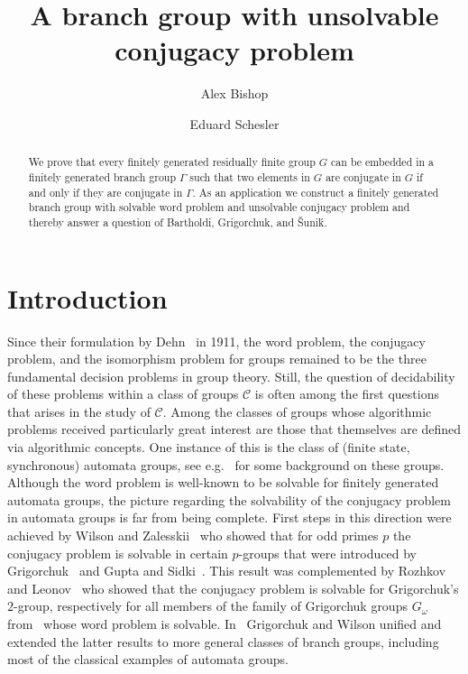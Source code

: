 \documentclass[a4paper]{amsart}
\title[A branch group with unsolvable conjugacy problem]{A branch group with unsolvable conjugacy problem}
\author[A. Bishop]{Alex Bishop}
\author[E. Schesler]{Eduard Schesler}
\numberwithin{equation}{section}
\theoremstyle{definition}
\theoremstyle{remark}
\begin{document}
\begin{abstract}
We prove that every finitely generated residually finite group $G$ can be embedded in a finitely generated branch group $\Gamma$ such that two elements in $G$ are conjugate in $G$ if and only if they are conjugate in $\Gamma$.
As an application we construct a finitely generated branch group with solvable word problem and unsolvable conjugacy problem and thereby answer a question of Bartholdi, Grigorchuk, and \v{S}uni\'{k}.
\end{abstract}
\maketitle

\section{Introduction}

\noindent Since their formulation by Dehn~\cite{Dehn1911} in 1911, the word problem, the conjugacy problem, and the isomorphism problem for groups remained to be the three fundamental decision problems in group theory.
Still, the question of decidability of these problems within a class of groups $\mathcal{C}$ is often among the first questions that arises in the study of $\mathcal{C}$.
Among the classes of groups whose algorithmic problems received particularly great interest are those that themselves are defined via algorithmic concepts.
One instance of this is the class of (finite state, synchronous) automata groups, see e.g.~\cite{BartholdiGrigorchukNekrashevych2003,BartholdiGrigorchukSunic03,GrigorchukNekrashevichSushchanskii00} for some background on these groups.
Although the word problem is well-known to be solvable for finitely generated automata groups, the picture regarding the solvability of the conjugacy problem in automata groups is far from being complete.
First steps in this direction were achieved by Wilson and Zalesskii~\cite{WilsonZalesskii1997} who showed that for odd primes $p$ the conjugacy problem is solvable in certain $p$-groups that were introduced by Grigorchuk~\cite{Grigorchuk1986} and Gupta and Sidki~\cite{GuptaSidki83}.
This result was complemented by Rozhkov~\cite{Rozhkov1998} and Leonov~\cite{Leonov1998} who showed that the conjugacy problem is solvable for Grigorchuk's $2$-group, respectively for all members of
the family of Grigorchuk groups $G_{\omega}$ from~\cite{Grigorchuk1985} whose word problem is solvable.
In~\cite{GrigorchukWilson2000} Grigorchuk and Wilson unified and extended the latter results to more general classes of branch groups, including most of the classical examples of automata groups.
\end{document}
